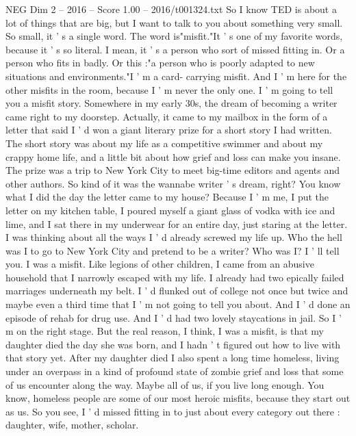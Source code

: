 \begin{textsample}{NEG Dim 2 – 2016 – Score 1.00 – 2016/t001324.txt}  \label{ex:f2_neg_054}
So I know TED is about a lot of things that are big, but I want to talk to you about something very small.
So small, it ' s a single word.
The word is"misfit."It ' s one of my favorite words, because it ' s so literal.
I mean, it ' s a person who sort of missed fitting in.
Or a person who fits in badly.
Or this :"a person who is poorly adapted to new situations and environments."I ' m a card- carrying misfit.
And I ' m here for the other misfits in the room, because I ' m never the only one.
I ' m going to tell you a misfit story.
Somewhere in my early 30s, the dream of becoming a writer came right to my doorstep.
Actually, it came to my mailbox in the form of a letter that said I ' d won a giant literary prize for a short story I had written.
The short story was about my life as a competitive swimmer and about my crappy home life, and a little bit about how grief and loss can make you insane.
The prize was a trip to New York City to meet big-time editors and agents and other authors.
So kind of it was the wannabe writer ' s dream, right?
You know what I did the day the letter came to my house?
Because I ' m me, I put the letter on my kitchen table, I poured myself a giant glass of vodka with ice and lime, and I sat there in my underwear for an entire day, just staring at the letter.
I was thinking about all the ways I ' d already screwed my life up.
Who the hell was I to go to New York City and pretend to be a writer?
Who was I?
I ' ll tell you.
I was a misfit.
Like legions of other children, I came from an abusive household that I narrowly escaped with my life.
I already had two epically failed marriages underneath my belt.
I ' d flunked out of college not once but twice and maybe even a third time that I ' m not going to tell you about.
And I ' d done an episode of rehab for drug use.
And I ' d had two lovely staycations in jail.
So I ' m on the right stage.
But the real reason, I think, I was a misfit, is that my daughter died the day she was born, and I hadn ' t figured out how to live with that story yet.
After my daughter died I also spent a long time homeless, living under an overpass in a kind of profound state of zombie grief and loss that some of us encounter along the way.
Maybe all of us, if you live long enough.
You know, homeless people are some of our most heroic misfits, because they start out as us.
So you see, I ' d missed fitting in to just about every category out there : daughter, wife, mother, scholar.

\end{textsample}
